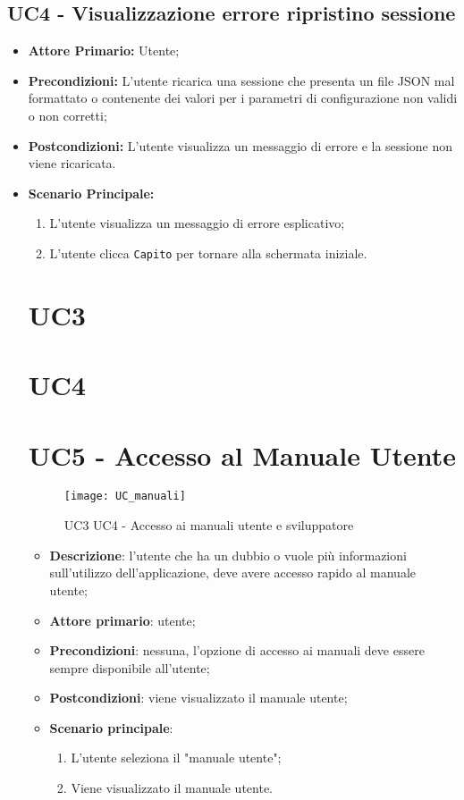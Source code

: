 \subsection{UC4 - Visualizzazione errore ripristino sessione}
\begin{itemize}
  \item \textbf{Attore Primario:} Utente;
  \item \textbf{Precondizioni:} L'utente ricarica una sessione che presenta un file JSON mal formattato o contenente dei valori per i parametri di configurazione non validi o non corretti;
  \item \textbf{Postcondizioni:} L'utente visualizza un messaggio di errore e la sessione non viene ricaricata.
  \item \textbf{Scenario Principale:}
  \begin{enumerate}
    \item L'utente visualizza un messaggio di errore esplicativo;
    \item L'utente clicca \texttt{Capito} per tornare alla schermata iniziale.
  \end{enumerate}

\section{UC3}

\section{UC4}

\section{UC5 - Accesso al Manuale Utente}
\begin{figure}[h]
  \centering
  \texttt{[image: UC\_manuali]}
  \caption{UC3 UC4 - Accesso ai manuali utente e sviluppatore}
\end{figure}

\begin{itemize}
  \item \textbf{Descrizione}: l'utente che ha un dubbio o vuole più informazioni sull'utilizzo dell'applicazione, deve avere accesso rapido al manuale utente;
  \item \textbf{Attore primario}: utente;
  \item \textbf{Precondizioni}: nessuna, l'opzione di accesso ai manuali deve essere sempre disponibile all'utente;
  \item \textbf{Postcondizioni}: viene visualizzato il manuale utente;
  \item \textbf{Scenario principale}: 
  \begin{enumerate}
    \item L'utente seleziona il "manuale utente";
    \item Viene visualizzato il manuale utente.
  \end{enumerate}
\end{itemize}


\end{itemize}
